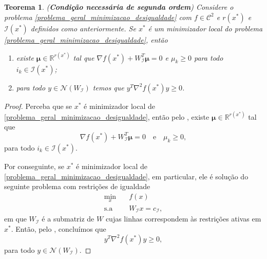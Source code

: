 \documentclass[12pt,a4paper]{scrartcl}
\def\RR{\mathds{R}}
\newtheorem{teo}{Teorema}
\theoremstyle{definition}%
\begin{document}
\begin{teo}(\textbf{Condição necessária de segunda ordem}) \label{teo:condicao_necessaria_2ordem_desigualdade}
Considere o problema \eqref{problema_geral_minimizacao_desigualdade} com $f \in \mathcal{C}^{2}$ e $r(x^{*})$ e $\mathcal{I}(x^{*})$ definidos como anteriormente. Se $x^{*}$ é um minimizador local do problema \eqref{problema_geral_minimizacao_desigualdade},  então
\begin{enumerate}
	\item[(i)] existe $\boldsymbol{\mu} \in \RR^{r(x^{*})}$ tal que $\nabla f(x^{*}) + W_{\mathcal{I}}^{T} \boldsymbol{\mu} =0$ e $\mu_{k} \geq 0$ para todo $i_{k} \in \mathcal{I}(x^{*})$;

	\item[(ii)] para todo $y \in \mathcal{N}(W_{\mathcal{I}})$ temos que $y^{T} \nabla^{2} f(x^{*})y \geq 0$.
\end{enumerate}
\end{teo}
\begin{proof}
Perceba que se $x^{*}$ é minimizador local de \eqref{problema_geral_minimizacao_desigualdade}, então pelo , existe $\boldsymbol{\mu} \in \RR^{r(x^{*})}$ tal que 
\[
\nabla f(x^{*}) + W_{\mathcal{I}}^{T} \boldsymbol{\mu} =0 \quad \text{e} \quad \mu_{k} \geq 0,
\] 
para todo $i_k \in \mathcal{I}(x^{*})$.

Por conseguinte, se $x^{*}$ é minimizador local de \eqref{problema_geral_minimizacao_desigualdade}, em particular, ele é solução do seguinte problema com restrições de igualdade
\[ 
\begin{aligned}
\min_{x} & \quad f(x) \\
\text{s.a} & \quad W_{\mathcal{I}}x=c_{\mathcal{I}} ,
\end{aligned}
\]
em que $W_{\mathcal{I}}$ é a submatriz de $W$ cujas linhas correspondem às restrições ativas em $x^{*}$. Então, pelo , concluímos que
\[
y^{T}\nabla^{2} f(x^{*})y \geq 0, 
\]
para todo $y \in \mathcal{N}(W_{\mathcal{I}})$. 
\end{proof}
\end{document}
